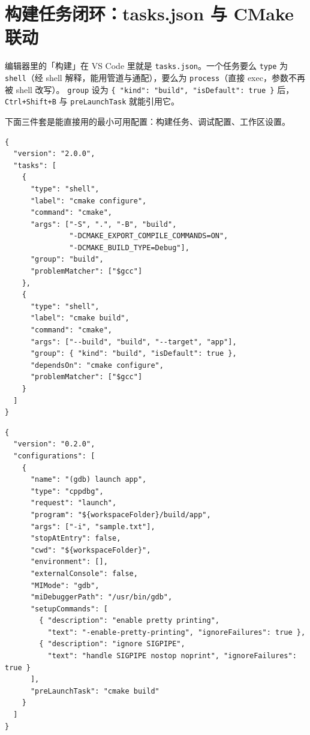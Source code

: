 \documentclass[12pt,a4paper,fontset=fandol]{ctexbook}
\begin{document}
\section{构建任务闭环：tasks.json 与 CMake 联动}\label{sec:ch07-s3}

编辑器里的「构建」在 VS Code 里就是 \texttt{tasks.json}。一个任务要么
\texttt{type} 为 \texttt{shell}（经 shell 解释，能用管道与通配），要么为
\texttt{process}（直接 exec，参数不再被 shell 改写）。
\texttt{group} 设为 \texttt{\{ "kind": "build", "isDefault": true \}} 后，
\texttt{Ctrl+Shift+B} 与 \texttt{preLaunchTask} 就能引用它。

下面三件套是能直接用的最小可用配置：构建任务、调试配置、工作区设置。

\begin{lstlisting}[style=jsonstyle,caption={.vscode/tasks.json：导出编译数据库并构建，带 problemMatcher},label={lst:ch07-tasks}]
{
  "version": "2.0.0",
  "tasks": [
    {
      "type": "shell",
      "label": "cmake configure",
      "command": "cmake",
      "args": ["-S", ".", "-B", "build",
               "-DCMAKE_EXPORT_COMPILE_COMMANDS=ON",
               "-DCMAKE_BUILD_TYPE=Debug"],
      "group": "build",
      "problemMatcher": ["$gcc"]
    },
    {
      "type": "shell",
      "label": "cmake build",
      "command": "cmake",
      "args": ["--build", "build", "--target", "app"],
      "group": { "kind": "build", "isDefault": true },
      "dependsOn": "cmake configure",
      "problemMatcher": ["$gcc"]
    }
  ]
}
\end{lstlisting}

\begin{lstlisting}[style=jsonstyle,caption={.vscode/launch.json：cppdbg 跑本地 gdb，调试前先构建},label={lst:ch07-launch}]
{
  "version": "0.2.0",
  "configurations": [
    {
      "name": "(gdb) launch app",
      "type": "cppdbg",
      "request": "launch",
      "program": "${workspaceFolder}/build/app",
      "args": ["-i", "sample.txt"],
      "stopAtEntry": false,
      "cwd": "${workspaceFolder}",
      "environment": [],
      "externalConsole": false,
      "MIMode": "gdb",
      "miDebuggerPath": "/usr/bin/gdb",
      "setupCommands": [
        { "description": "enable pretty printing",
          "text": "-enable-pretty-printing", "ignoreFailures": true },
        { "description": "ignore SIGPIPE",
          "text": "handle SIGPIPE nostop noprint", "ignoreFailures": true }
      ],
      "preLaunchTask": "cmake build"
    }
  ]
}
\end{lstlisting}
\end{document}
